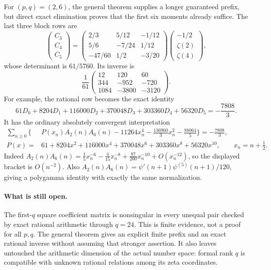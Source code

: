 For $(p,q)=(2,6)$, the general theorem supplies a longer guaranteed
prefix, but direct exact elimination proves that the first six moments
already suffice. The last three block rows are
\[
 \begin{pmatrix}C_3\\C_4\\C_5\end{pmatrix}
 =\begin{pmatrix}
  2/3&5/12&-1/12\\
  5/6&-7/24&1/12\\
  -47/60&1/2&-3/20
 \end{pmatrix}
 \begin{pmatrix}-1/2\\\zeta(2)\\\zeta(4)\end{pmatrix},
\]
whose determinant is $61/5760$. Its inverse is
\begin{equation}\label{tr:26inverse}
 \frac1{61}
 \begin{pmatrix}
 12&120&60\\344&-952&-720\\1084&-3800&-3120
 \end{pmatrix}.
\end{equation}
For example, the rational row becomes the exact identity
\begin{equation}\label{tr:26rational}
 61D_0+8204D_1+116000D_2+370048D_3
      +303360D_4+56320D_5=-\frac{7808}{3}.
\end{equation}
It has the ordinary absolutely convergent interpretation
\begin{equation}\label{tr:26ordinary}
 \begin{split}
 \sum_{n\ge0}\bigg\{&P(x_n)A_2(n)A_6(n)
   -11264x_n^4-\frac{136960}{3}x_n^2-\frac{88064}{5}\bigg\}
   =-\frac{7808}{3},\\
 P(x)={}&61+8204x^2+116000x^4+370048x^6
                +303360x^8+56320x^{10},\qquad x_n=n+\frac12.
 \end{split}
\end{equation}
Indeed $A_2(n)A_6(n)=\frac15x_n^{-6}
-\frac4{15}x_n^{-8}+\frac{87}{200}x_n^{-10}+O(x_n^{-12})$,
so the displayed bracket is $O(n^{-2})$. Also
$A_2(n)A_6(n)=\psi'(n+1)\psi^{(5)}(n+1)/120$, giving a
polygamma identity with exactly the same normalization.

\paragraph{What is still open.}
The first-$q$ square coefficient matrix is nonsingular in every
unequal pair checked by exact rational arithmetic through $q=24$.
This is finite evidence, not a proof for all $p,q$. The general
theorem gives an explicit finite prefix and an exact rational inverse
without assuming that stronger assertion. It also leaves untouched
the arithmetic dimension of the actual number space: formal rank $q$
is compatible with unknown rational relations among its zeta coordinates.
